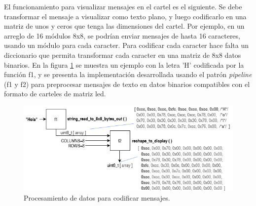 El funcionamiento para visualizar mensajes en el cartel es el siguiente. Se debe transformar el mensaje a visualizar como texto plano, y luego codificarlo en una matriz de unos y ceros que tenga las dimensiones del cartel. Por ejemplo, en un arreglo de 16 módulos 8x8, se podrían enviar mensajes de hasta 16 caracteres, usando un módulo para cada caracter. Para codificar cada caracter hace falta un diccionario que permita transformar cada caracter en una matriz de 8x8 datos binarios. En la figura \ref{fig:dataPipeline} se muestra un ejemplo con la letra 'H' codificada por la función f1, y se presenta la implementación desarrollada usando el patrón \textit{pipeline} (f1 y f2) para preprocesar mensajes de texto en datos binarios compatibles con el formato de carteles de matriz led.

\begin{figure}[htbp]
	\centering
	\includegraphics[width=1\textwidth]{./Figures/dataPipeline.png}
	\caption{Procesamiento de datos para codificar mensajes.}
	\label{fig:dataPipeline}
\end{figure}


